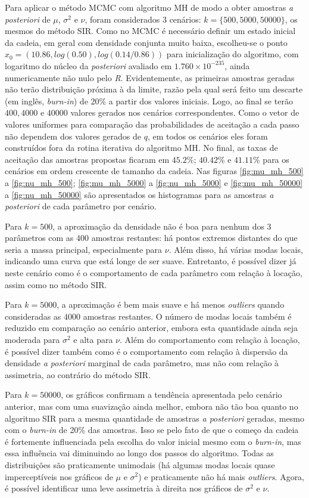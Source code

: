 \documentclass[12pt,reqno,a4paper,oneside]{article}
\begin{document}
Para aplicar o método MCMC com algoritmo MH de modo a obter amostras \textit{a posteriori} de $\mu$, $\sigma^2$ e $\nu$, foram considerados 3 cenários: $k = \{500, 5000, 50000\}$, os mesmos do método SIR. Como no MCMC é necessário definir um estado inicial da cadeia, em geral com densidade conjunta muito baixa, escolheu-se o ponto $x_0 = (10.86, log(0.50), log(0.14/0.86))$ para inicialização do algoritmo, com logaritmo do núcleo da \textit{posteriori} avaliado em $1.760 \times 10^{-235}$, ainda numericamente não nulo pelo \textit{R}. Evidentemente, as primeiras amostras geradas não terão distribuição próxima à da limite, razão pela qual será feito um descarte (em inglês, \textit{burn-in}) de 20\% a partir dos valores iniciais. Logo, ao final se terão $400, 4000$ e $40000$ valores gerados nos cenários correspondentes. Como o vetor de valores uniformes para comparação das probabilidades de aceitação a cada passo não dependem dos valores gerados de $q$, em todos os cenários eles foram construídos fora da rotina iterativa do algoritmo MH. No final, as taxas de aceitação das amostras propostas ficaram em $45.2\%$; $40.42\%$ e $41.11\%$ para os cenários em ordem crescente de tamanho da cadeia. Nas figuras \ref{fig:mu_mh_500} a \ref{fig:nu_mh_500}; \ref{fig:mu_mh_5000} a \ref{fig:nu_mh_5000} e \ref{fig:mu_mh_50000} a \ref{fig:nu_mh_50000} são apresentados os histogramas para as amostras \textit{a posteriori} de cada parâmetro por cenário.

Para $k=500$, a aproximação da densidade não é boa para nenhum dos 3 parâmetros com as $400$ amostras restantes: há pontos extremos distantes do que seria a massa principal, especialmente para $\nu$. Além disso, há várias modas locais, indicando uma curva que está longe de ser suave. Entretanto, é possível dizer já neste cenário como é o comportamento de cada parâmetro com relação à locação, assim como no método SIR.

Para $k=5000$, a aproximação é bem mais suave e há menos \textit{outliers} quando consideradas as $4000$ amostras restantes. O número de modas locais também é reduzido em comparação ao cenário anterior, embora esta quantidade ainda seja moderada para $\sigma^2$ e alta para $\nu$. Além do comportamento com relação à locação, é possível dizer também como é o comportamento com relação à dispersão da densidade \textit{a posteriori} marginal de cada parâmetro, mas não com relação à assimetria, ao contrário do método SIR.

Para $k=50000$, os gráficos confirmam a tendência apresentada pelo cenário anterior, mas com uma suavização ainda melhor, embora não tão boa quanto no algoritmo SIR para a mesma quantidade de amostras \textit{a posteriori} geradas, mesmo com o \textit{burn-in} de 20\% das amostras. Isso se pelo fato de que o começo da cadeia é fortemente influenciada pela escolha do valor inicial mesmo com o \textit{burn-in}, mas essa influência vai diminuindo ao longo dos passos do algoritmo. Todas as distribuições são praticamente unimodais (há algumas modas locais quase imperceptíveis nos gráficos de $\mu$ e $\sigma^2$) e praticamente não há mais \textit{outliers}. Agora, é possível identificar uma leve assimetria à direita nos gráficos de $\sigma^2$ e $\nu$.
\end{document}
